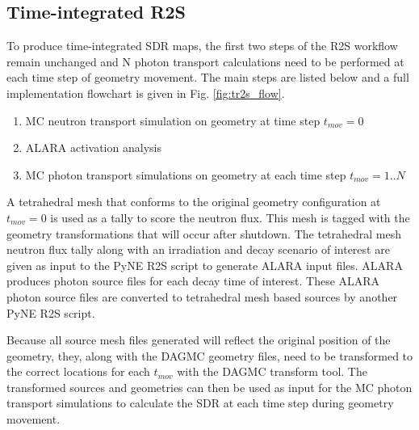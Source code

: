 \subsection{Time-integrated R2S}\label{sec:tr2s}
To produce time-integrated SDR maps, the
first two steps of the R2S workflow remain unchanged and
N photon transport calculations need to be performed at each
time step of geometry movement.  The main steps are listed below and
a full implementation flowchart is given in Fig. \ref{fig:tr2s_flow}.
\begin{enumerate}
	\item{MC neutron transport simulation on geometry at time step $t_{mov}=0$}
	\item{ALARA activation analysis} 
	\item{MC photon transport simulations on geometry at each time step $t_{mov}=1..N$}
\end{enumerate}
A tetrahedral mesh that conforms to
the original geometry configuration at $t_{mov}=0$ is used as a tally to score the neutron flux.
This mesh is tagged with the geometry transformations that will occur after
shutdown.  The tetrahedral mesh neutron flux tally along with an irradiation and decay
scenario of interest are given as input to the PyNE R2S
script to generate ALARA input files.  ALARA produces photon source
files for each decay time of interest.  These ALARA photon source files are
converted to tetrahedral mesh based sources by another PyNE R2S script.  

Because all
source mesh files generated will reflect the original position of the geometry,
they, along with the DAGMC geometry files, need to be transformed to the 
correct locations for each $t_{mov}$ with the DAGMC transform tool.  The
transformed sources and geometries can then be used as input for the MC photon
transport simulations to calculate the SDR at each time step during geometry movement.

